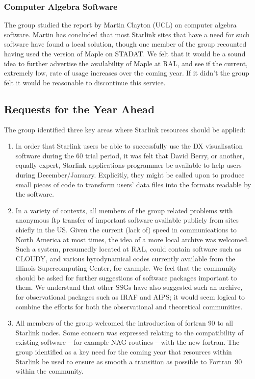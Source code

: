 \subsubsection{Computer Algebra Software}

The group studied the report by Martin Clayton (UCL) on computer
algebra software. Martin has concluded that most Starlink sites that
have a need for such software have found a local solution, though one
member of the group recounted having used the version of Maple on
STADAT. We felt that it would be a sound idea to further advertise the
availability of Maple at RAL, and see if the current, extremely low,
rate of usage increases over the coming year. If it didn't the group
felt it would be reasonable to discontinue this service.

\subsection{Requests for the Year Ahead}

The group identified three key areas where Starlink resources should
be applied:

\begin{enumerate}
\item In order that Starlink users be able to successfully use
the DX visualisation software during the 60 trial period, it was felt
that David Berry, or another, equally expert, Starlink applications
programmer be available to help users during December/January.
Explicitly, they might be called upon to produce small pieces of code
to transform users' data files into the formats readable by the
software.

\item In a variety of contexts, all members of the group related problems
with anonymous ftp transfer of important software available publicly
from sites chiefly in the US. Given the current (lack of) speed in
communications to North America at most times, the idea of a more
local archive was welcomed. Such a system, presumedly located at RAL,
could contain software such as CLOUDY, and various hyrodynamical codes
currently available from the Illinois Supercomputing Center, for
example.  We feel that the community should be asked for further
suggestions of software packages important to them.  We understand
that other SSGs have also suggested such an archive, for observational
packages such as IRAF and AIPS; it would seem logical to combine the
efforts for both the observational and theoretical communities.

\item All members of the group welcomed the introduction of fortran 90
to all Starlink nodes. Some concern was expressed relating to the
compatibility of existing software -- for example NAG routines -- with
the new fortran.  The group identified as a key need for the coming
year that resources within Starlink be used to ensure as smooth a
transition as possible to Fortran~90 within the community.

\end{enumerate}

